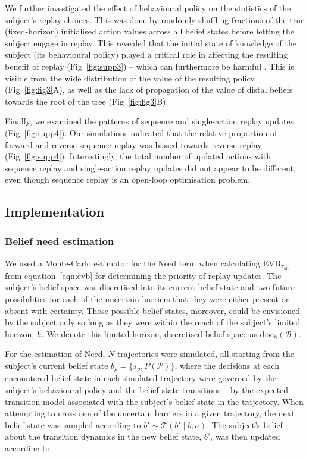 We further investigated the effect of behavioural policy on the statistics of the subject's replay choices. This was done by randomly shuffling fractions of the true (fixed-horizon) initialised action values across all belief states before letting the subject engage in replay. This revealed that the initial state of knowledge of the subject (its behavioural policy) played a critical role in affecting the resulting benefit of replay (Fig~\ref{fig:supp3}) -- which can furthermore be harmful \parencite{antonovOptimismPessimismOptimised2022}. This is visible from the wide distribution of the value of the resulting policy (Fig~\ref{fig:fig3}A), as well as the lack of propagation of the value of distal beliefs towards the root of the tree (Fig~\ref{fig:fig3}B).

Finally, we examined the patterns of sequence and single-action replay updates (Fig~\ref{fig:supp4}). Our simulations indicated that the relative proportion of forward and reverse sequence replay was biased towards reverse replay (Fig~\ref{fig:supp4}). Interestingly, the total number of updated actions with sequence replay and single-action replay updates did not appear to be different, even though sequence replay is an open-loop optimisation problem.

\subsection*{Implementation}

\subsubsection*{Belief need estimation}

We used a Monte-Carlo estimator for the Need term when calculating $\text{EVB}_{\pi_{\text{old}}}$ from equation~\ref{eqn:evb} for determining the priority of replay updates. The subject's belief space was discretised into its current belief state and two future possibilities for each of the uncertain barriers that they were either present or absent with certainty. Those possible belief states, moreover, could be envisioned by the subject only so long as they were within the reach of the subject's limited horizon, $h$. We denote this limited horizon, discretised belief space as $\text{disc}_h(\mathcal{B})$. 

For the estimation of Need, $N$ trajectories were simulated, all starting from the subject's current belief state $b_\rho=\{ s_\rho, P(\mathcal{P}) \}$, where the decisions at each encountered belief state in each simulated trajectory were governed by the subject's behavioural policy and the belief state transitions -- by the expected transition model associated with the subject's belief state in the trajectory. When attempting to cross one of the uncertain barriers in a given trajectory, the next belief state was sampled according to $b' \sim \mathcal{T}(b'\mid b, a)$. The subject's belief about the transition dynamics in the new belief state, $b'$, was then updated according to:

